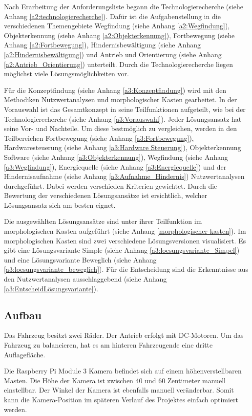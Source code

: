 \documentclass[../main.tex]{subfiles}
\begin{document}
Nach Erarbeitung der Anforderungsliste begann die Technologierecherche (siehe Anhang \ref{a2:technologierecherche}). Dafür ist die Aufgabenstellung in die verschiedenen Themengebiete Wegfindung (siehe Anhang \ref{a2:Wegfindung}), Objekterkennung (siehe Anhang \ref{a2:Objekterkennung}), Fortbewegung (siehe Anhang \ref{a2:Fortbewegung}), Hindernisbewältigung (siehe Anhang \ref{a2:Hindernisbewältigung}) und Antrieb und Orientierung (siehe Anhang \ref{a2:Antrieb_Orientierung}) unterteilt. Durch die Technologierecherche liegen möglichst viele Lösungsmöglichkeiten vor. 

Für die Konzeptfindung (siehe Anhang \ref{a3:Konzeptfindung}) wird mit den Methodiken Nutzwertanalysen und morphologischer Kasten gearbeitet. In der Vorauswahl ist das Gesamtkonzept in seine Teilfunktionen aufgeteilt, wie bei der Technologierecherche (siehe Anhang \ref{a3:Vorauswahl}). Jeder Lösungsansatz hat seine Vor- und Nachteile. Um diese bestmöglich zu vergleichen, werden in den Teilbereichen Fortbewegung (siehe Anhang \ref{a3:Fortbewegung}), Hardwaresteuerung (siehe Anhang \ref{a3:Hardware Steuerung}), Objekterkennung Software (siehe Anhang \ref{a3:Objekterkennung}), Wegfindung (siehe Anhang \ref{a3:Wegfindung}), Energiequelle (siehe Anhang \ref{a3:Energiequelle}) und der Hindernisaufnahme (siehe Anhang \ref{a3:Aufnahme_Hindernis}) Nutzwertanalysen durchgeführt. Dabei werden verschieden Kriterien gewichtet. Durch die Bewertung der verschiedenen Lösungsansätze ist ersichtlich, welcher Lösungsansatz sich am besten eignet.

Die ausgewählten Lösungsansätze sind unter ihrer Teilfunktion im morphologischen Kasten aufgeführt (siehe Anhang \ref{morphologischer kasten}). Im morphologischen Kasten sind zwei verschiedene Lösungsversionen visualisiert. Es gibt eine Lösungsvariante Simple (siehe Anhang \ref{a3:loesungsvariante_Simpel}) und eine Lösungsvariante Beweglich (siehe Anhang \ref{a3:loesungsvariante_beweglich}). Für die Entscheidung sind die Erkenntnisse aus den Nutzwertanalysen ausschlaggebend (siehe Anhang \ref{a3:EntscheidLösungsvariante}).
\newpage

\subsection{Aufbau}

Das Fahrzeug besitzt zwei Räder. Der Antrieb erfolgt mit DC-Motoren. Um das Fahrzeug zu balancieren, hat es am hinteren Fahrzeugende eine dritte Auflagefläche.

Die Raspberry Pi Module 3 Kamera befindet sich auf einem höhenverstellbaren Masten. Die Höhe der Kamera ist zwischen 40 und 60 Zentimeter manuell einstellbar. Der Winkel der Kamera ist ebenfalls manuell veränderbar. Somit kann die Kamera-Position im späteren Verlauf des Projektes einfach optimiert werden.
\end{document}
